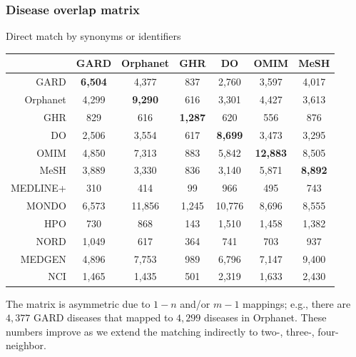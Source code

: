 ﻿\documentclass[anchorcolor=blue,linkcolor=blue]{beamer}
\begin{document}
\begin{frame}
  \frametitle{Disease overlap matrix}
  \begin{block}{Direct match by synonyms or identifiers}
    \begin{center}\tiny
      \begin{tabular}{rcccccc}\toprule
        & GARD & Orphanet & GHR & DO & OMIM & MeSH\\ \midrule
        GARD & \textbf{6,504}&4,377&837&2,760&3,597&4,017\\
        Orphanet &4,299&\textbf{9,290}&616&3,301&4,427&3,613\\
        GHR &829&616&\textbf{1,287}&620&556&876\\
        DO &2,506&3,554&617&\textbf{8,699}&3,473&3,295\\
        OMIM &4,850&7,313&883&5,842&\textbf{12,883}&8,505\\
        MeSH &3,889&3,330&836&3,140&5,871&\textbf{8,892}\\
        MEDLINE+ &310&414&99&966&495&743\\
        MONDO &6,573&11,856&1,245&10,776&8,696&8,555\\
        HPO &730&868&143&1,510&1,458&1,382\\
        NORD & 1,049 & 617 &364 &741 &703 &937 \\
        MEDGEN &4,896 &7,753 &989 &6,796 &7,147 &9,400 \\
        NCI & 1,465 &1,435 &501 &2,319 &1,633 &2,430 \\ \bottomrule
      \end{tabular}
    \end{center}
    The matrix is asymmetric due to $1-n$ and/or $m-1$ mappings; e.g.,
    there are $4,377$ GARD diseases that mapped to $4,299$ diseases in
    Orphanet. These numbers improve as we extend the
    matching indirectly to two-, three-, four-neighbor.
  \end{block}
\end{frame}
\end{document}
